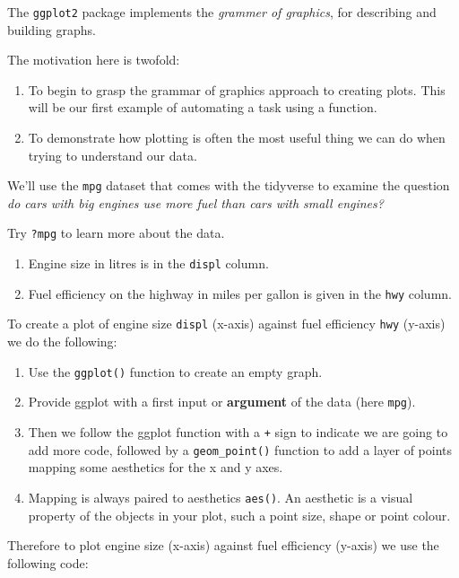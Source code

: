 \documentclass[12pt,]{book}
\providecommand{\tightlist}{%
  \setlength{\itemsep}{0pt}\setlength{\parskip}{0pt}}
\begin{document}
The \texttt{ggplot2} package implements the \emph{grammer of graphics}, for describing
and building graphs.

The motivation here is twofold:

\begin{enumerate}
\def\labelenumi{\arabic{enumi}.}
\tightlist
\item
  To begin to grasp the grammar of graphics approach to creating plots. This will
  be our first example of automating a task using a function.
\item
  To demonstrate how plotting is often the most useful thing we can do when
  trying to understand our data.
\end{enumerate}

We'll use the \texttt{mpg} dataset that comes with the tidyverse to examine
the question \emph{do cars with big engines use more fuel than cars with small engines?}

Try \texttt{?mpg} to learn more about the data.

\begin{enumerate}
\def\labelenumi{\arabic{enumi}.}
\tightlist
\item
  Engine size in litres is in the \texttt{displ} column.
\item
  Fuel efficiency on the highway in miles per gallon is given in the \texttt{hwy} column.
\end{enumerate}

To create a plot of engine size \texttt{displ} (x-axis) against fuel efficiency \texttt{hwy} (y-axis) we do the following:

\begin{enumerate}
\def\labelenumi{\arabic{enumi}.}
\tightlist
\item
  Use the \texttt{ggplot()} function to create an empty graph.
\item
  Provide ggplot with a first input or \textbf{argument} of the data (here \texttt{mpg}).
\item
  Then we follow the ggplot function with a \texttt{+} sign to indicate
  we are going to add more code, followed by a \texttt{geom\_point()} function to add a
  layer of points mapping some aesthetics for the x and y axes.
\item
  Mapping is always paired to aesthetics \texttt{aes()}. An aesthetic is a visual
  property of the objects in your plot, such a point size, shape or point colour.
\end{enumerate}

Therefore to plot engine size (x-axis) against fuel efficiency (y-axis) we
use the following code:
\end{document}
